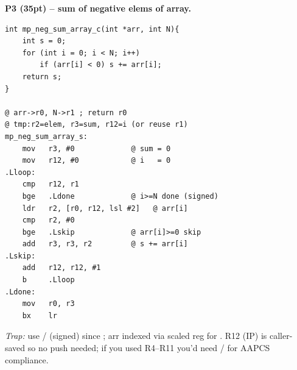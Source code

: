 \begin{qp}\textbf{P3 (35pt) -- sum of negative elems of array.}
\begin{lstlisting}
int mp_neg_sum_array_c(int *arr, int N){
    int s = 0;
    for (int i = 0; i < N; i++)
        if (arr[i] < 0) s += arr[i];
    return s;
}

@ arr->r0, N->r1 ; return r0
@ tmp:r2=elem, r3=sum, r12=i (or reuse r1)
mp_neg_sum_array_s:
    mov   r3, #0             @ sum = 0
    mov   r12, #0            @ i   = 0
.Lloop:
    cmp   r12, r1
    bge   .Ldone             @ i>=N done (signed)
    ldr   r2, [r0, r12, lsl #2]   @ arr[i]
    cmp   r2, #0
    bge   .Lskip             @ arr[i]>=0 skip
    add   r3, r3, r2         @ s += arr[i]
.Lskip:
    add   r12, r12, #1
    b     .Lloop
.Ldone:
    mov   r0, r3
    bx    lr
\end{lstlisting}
\emph{Trap:} use / (signed) since ; arr indexed via scaled reg  for . R12 (IP) is caller-saved so no push needed; if you used R4--R11 you'd need / for AAPCS compliance.
\end{qp}

